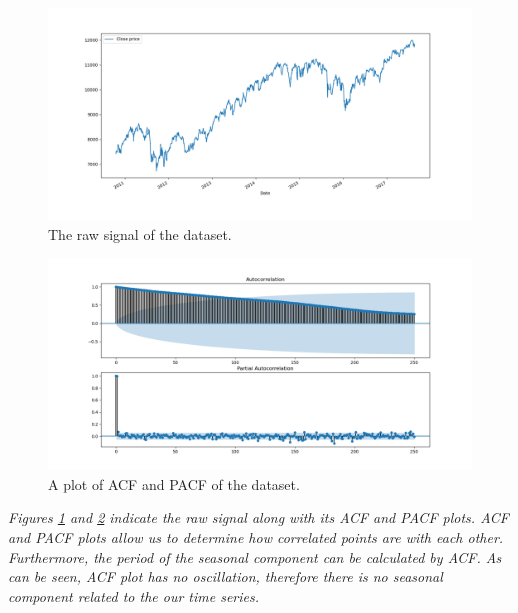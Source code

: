 \begin{figure}[H]
    \centering
    \begin{minipage}[b]{1\textwidth}
        \includegraphics[width=\textwidth]{figures/Ass2/Ass2_Q2_raw_signal.png}
    \end{minipage}
    \caption{The raw signal of the dataset.}
    \label{fig:Ass2_Q2_raw_signal}
\end{figure}

\begin{figure}[H]
    \centering
    \begin{minipage}[b]{1\textwidth}
        \includegraphics[width=\textwidth]{figures/Ass2/Ass2_Q2_PACF_ACF.png}
    \end{minipage}
    \caption{A plot of \gls{ACF} and \gls{PACF} of the dataset.}
    \label{fig:Ass2_Q2_PACF_ACF}
\end{figure}


\textit{Figures \ref{fig:Ass2_Q2_raw_signal} and \ref{fig:Ass2_Q2_PACF_ACF} indicate the raw signal along with its \gls{ACF} and \gls{PACF} plots. \gls{ACF} and \gls{PACF} plots allow us to determine how correlated points are with each other. Furthermore, the period of the seasonal component can be calculated by \gls{ACF}. As can be seen, \gls{ACF} plot has no oscillation, therefore there is no seasonal component related to the our time series.}




